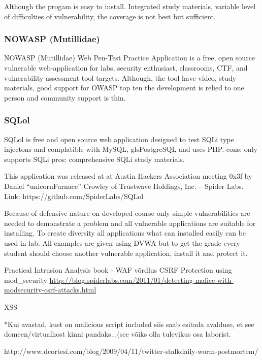 Although the progam is easy to install. Integrated study materials, variable level of  difficulties of vulnerability, the coverage is not best but sufficient.

\subsubsection{NOWASP (Mutillidae)}
NOWASP (Mutillidae) Web Pen-Test Practice Application is a free, open source vulnerable web-application for labs, security enthusiast, classrooms, \gls{CTF}, and vulnerability assessment tool targets. \citep{website:Mutillidae} Although, the tool have video, study materials, good support for \gls{OWASP} top ten the development is relied to one person and community support is thin.
\subsubsection{SQLol}
SQLol is free and open source web application designed to test \gls{SQLi} type injectons and complatible with \gls{MySQL}, gls{PostgreSQL} and uses \gls{PHP}.
cons: only supports \gls{SQLi}
pros: comprehensive  \gls{SQLi} study materials.

 This application was released at at Austin Hackers Association meeting 0x3f by Daniel “unicornFurnace” Crowley of Trustwave Holdings, Inc. – Spider Labs.
Link: https://github.com/SpiderLabs/SQLol



Because of defensive nature on developed course only simple vulnerabilities are needed to demonstrate a problem and all vulnerable applications are suitable for installing. To create diversity all applications what can installed easily can be used in lab. All examples are given using \gls{DVWA} but to get the grade every student should choose another vulnerable application, install it and protect it.

Practical Intrusion Analysis book - WAF võrdlus \citep{book:practica_intrusion_analysis}
\gls{CSRF}
Protection using mod\_security
\url{http://blog.spiderlabs.com/2011/01/detecting-malice-with-modsecurity-csrf-attacks.html}

\gls{XSS}
{
\color{red} *Kui avastad, kust on malicious script included siis saab esitada avalduse, et see domeen/virtualhost kinni pandaks...(see võiks olla tulevikus osa laborist.

http://www.dcortesi.com/blog/2009/04/11/twitter-stalkdaily-worm-postmortem/
}





